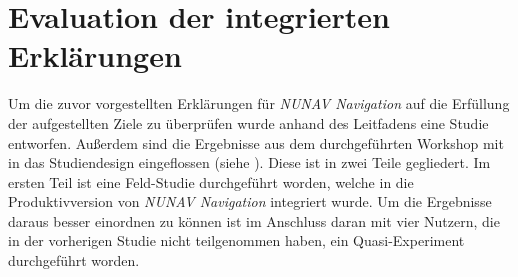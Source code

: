 \section{Evaluation der integrierten Erklärungen}

Um die zuvor vorgestellten Erklärungen für \textit{NUNAV Navigation} auf die Erfüllung der aufgestellten Ziele zu überprüfen wurde anhand des Leitfadens eine Studie entworfen. Außerdem sind die Ergebnisse aus dem durchgeführten Workshop mit in das Studiendesign eingeflossen (siehe ). Diese ist in zwei Teile gegliedert. Im ersten Teil ist eine Feld-Studie durchgeführt worden, welche in die Produktivversion von \textit{NUNAV Navigation} integriert wurde. Um die Ergebnisse daraus besser einordnen zu können ist im Anschluss daran mit vier Nutzern, die in der vorherigen Studie nicht teilgenommen haben, ein Quasi-Experiment durchgeführt worden.







